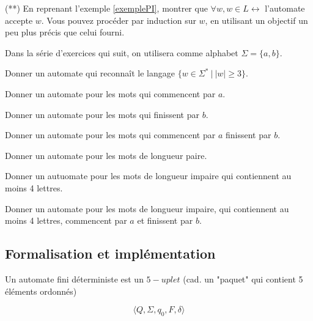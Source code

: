 \begin{exercice} (**) En reprenant l'exemple \ref{exemplePI}, montrer que $\forall w, w \in L \leftrightarrow$ l'automate accepte $w$. Vous pouvez procéder par induction sur $w$, en utilisant un objectif un peu plus précis que celui fourni.
\end{exercice}

Dans la série d'exercices qui suit, on utilisera comme alphabet $\Sigma = \{a,b\}$.

\begin{exercice}
Donner un automate qui reconnaît le langage $\{w \in \Sigma^*~|~|w| \geq 3\}$. 
\end{exercice}

\begin{exercice}
Donner un automate pour les mots qui commencent par $a$.
\end{exercice}

\begin{exercice}
Donner un automate pour les mots qui finissent par $b$.
\end{exercice}

\begin{exercice}
Donner un automate pour les mots qui commencent par $a$ finissent par $b$.
\end{exercice}


\begin{exercice}
Donner un automate pour les mots de longueur paire.
\end{exercice}

\begin{exercice}
Donner un autuomate pour les mots de longueur impaire qui contiennent au moins 4 lettres.
\end{exercice}

\begin{exercice}
Donner un automate pour les mots de longueur impaire, qui contiennent au moins 4 lettres, commencent par $a$ et finissent par $b$.
\end{exercice}

\subsection{Formalisation et implémentation}

Un automate fini déterministe est un $5-uplet$ (cad. un "paquet" qui contient 5 éléments ordonnés)

\[
\big \langle Q,\Sigma,q_0,F,\delta \big \rangle
\]

